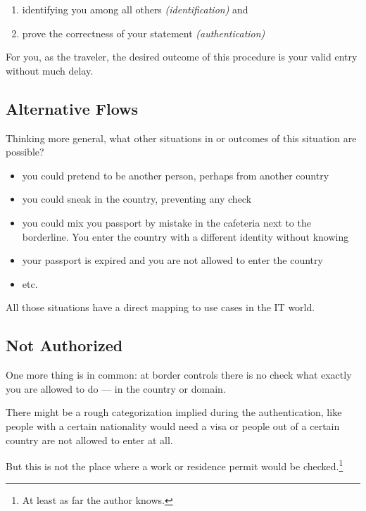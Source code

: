 \documentclass[11pt]{report}
\begin{document}
\begin{enumerate}

    \item identifying you among all others \emph{(identification)} and
    \item prove the correctness of your statement
        \emph{(authentication)}

\end{enumerate}

For you, as the traveler, the desired outcome of this procedure is your
valid entry without much delay.


\subsection{Alternative Flows}

Thinking more general, what other situations in or outcomes of this
situation are possible?

\begin{itemize}

    \item you could pretend to be another person, perhaps from another 
        country
    \item you could sneak in the country, preventing any check
    \item you could mix you passport by mistake in the cafeteria next 
        to the borderline.  You enter the country with a different identity 
        without knowing
    \item your passport is expired and you are not allowed to enter the 
        country
    \item etc.

\end{itemize}

All those situations have a direct mapping to use cases in the IT world.


\subsection{Not Authorized}

One more thing is in common: at border controls there is no check what
exactly you are allowed to do --- in the country or domain.

There might be a rough categorization implied during the authentication,
like people with a certain nationality would need a visa or people out
of a certain country are not allowed to enter at all.

But this is not the place where a work or residence permit would be
checked.\footnote{At least as far the author knows.}
\end{document}

